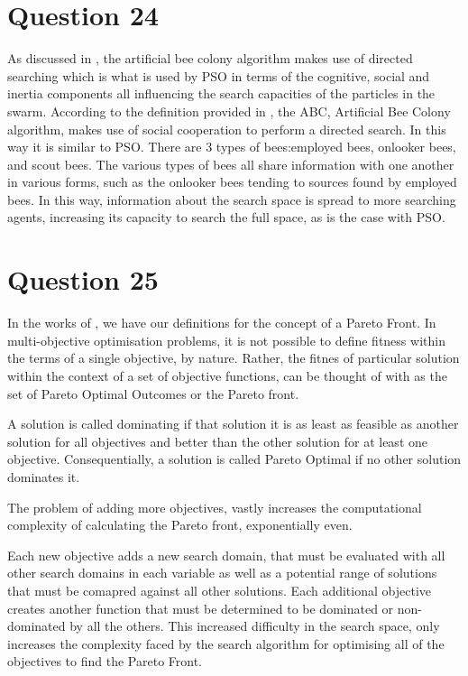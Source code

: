 \documentclass[12pt]{article}
\begin{document}
\section{Question 24}
As discussed in \cite{Jones:2011:CFA:2023607.2023640}, the artificial bee colony algorithm makes use of directed searching which is what is used by PSO in terms of the cognitive, social and inertia components all influencing the search capacities of the particles in the swarm. According to the definition provided in \cite{Karaboga05}, the ABC, Artificial Bee Colony algorithm, makes use of social cooperation to perform a directed search. In this way it is similar to PSO. There are 3 types of bees:employed bees, onlooker bees, and scout bees. The various types of bees all share information with one another in various forms, such as the onlooker bees tending to sources found by employed bees. In this way, information about the search space is spread to more searching agents, increasing its capacity to search the full space, as is the case with PSO.
\section{Question 25}
In the works of \cite{nonlinearm2013}, we have our definitions for the concept of a Pareto Front. In multi-objective optimisation problems, it is not possible to define fitness within the terms of a single objective, by nature. Rather, the fitnes of particular solution within the context of a set of objective functions, can be thought of with as the set of Pareto Optimal Outcomes or the Pareto front. 

A solution is called dominating if that solution it is as least as feasible as another solution for all objectives and better than the other solution for at least one objective. Consequentially, a solution is called Pareto Optimal if no other solution dominates it.

The problem of adding more objectives, vastly increases the computational complexity of calculating the Pareto front, exponentially even.

Each new objective adds a new search domain, that must be evaluated with all other search domains in each variable as well as a potential range of solutions that must be comapred against all other solutions. Each additional objective creates another function that must be determined to be dominated or non-dominated by all the others. This increased difficulty in the search space, only increases the complexity faced by the search algorithm for optimising all of the objectives to find the Pareto Front.
\end{document}
